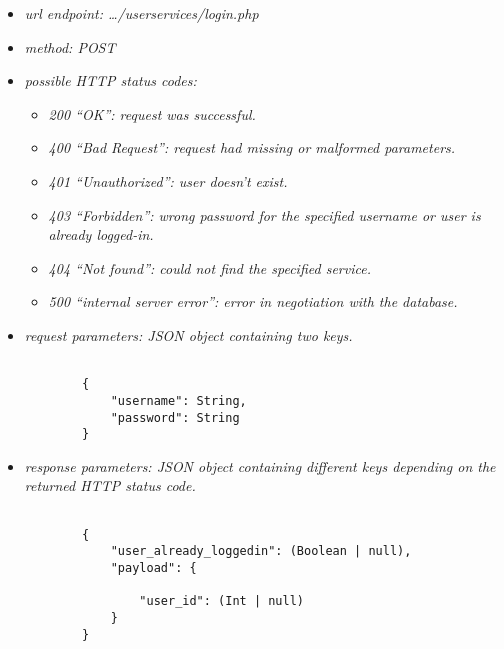 \documentclass[a4paper,12pt]{article}
\begin{document}
            \begin{itemize}

                \item \textit{url endpoint: \ldots/userservices/login.php}
                \item \textit{method: POST}
                \item \textit{possible HTTP status codes:}

                    \begin{itemize}

                        \item \textit{200 ``OK'': request was successful.}
                        \item \textit{400 ``Bad Request'': request had missing or malformed parameters.}
                        \item \textit{401 ``Unauthorized'': user doesn't exist.}
                        \item \textit{403 ``Forbidden'': wrong password for the specified username or user is already logged-in.}
                        \item \textit{404 ``Not found'': could not find the specified service.}
                        \item \textit{500 ``internal server error'': error in negotiation with the database.}

                    \end{itemize}

                \item \textit{request parameters: JSON object containing two keys.}
    
    \begin{verbatim}
                        
        {
            "username": String,
            "password": String
        }

    \end{verbatim}

                \item \textit{response parameters: JSON object containing different keys depending on the returned HTTP status code.}

    \begin{verbatim}
                        
        {
            "user_already_loggedin": (Boolean | null),
            "payload": {

                "user_id": (Int | null)
            }
        }
            
    \end{verbatim}

            \end{itemize}
\end{document}
